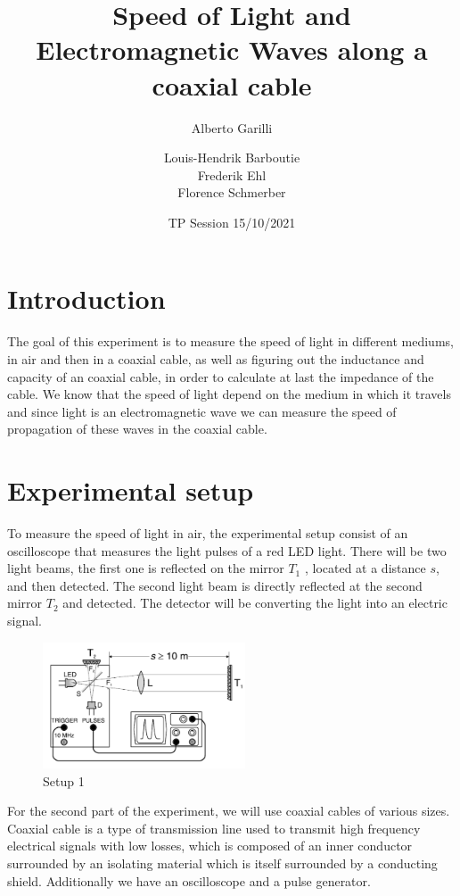 \documentclass{scrartcl}
\title{Speed of Light and Electromagnetic Waves along a coaxial cable}
\subtitle{Alberto Garilli}
\date{TP Session 15/10/2021}
\author{Louis-Hendrik Barboutie \\ Frederik Ehl \\ Florence Schmerber}
\begin{document}
\maketitle

\clearpage

\tableofcontents
\listoffigures
	
\clearpage

\section{Introduction}

The goal of this experiment is to measure the speed of light in different mediums, in air and then in a coaxial cable, as well as figuring out the inductance and capacity of an coaxial cable, in order to calculate at last the impedance of the cable. We know that the speed of light depend on the medium in which it travels and since light is an electromagnetic wave we can measure the speed of propagation of these waves in the coaxial cable.
\section{Experimental setup}

To measure the speed of light in air, the experimental setup consist of an oscilloscope that measures the light pulses of a red LED light. There will be two light beams, the first one is reflected on the mirror $T_1$ , located at a distance $s$, and then detected. The second light beam is directly reflected at the second mirror $T_2$ and detected. The detector will be converting the light into an electric signal.

\begin{figure}[h]
    \centering
    \includegraphics[width=6cm]{exp_1.png}
    \caption{Setup 1}
    \label{fig:setup1}
\end{figure}

For the second part of the experiment, we will use coaxial cables of various sizes. Coaxial cable is a type of transmission line used to transmit high frequency electrical signals with low losses, which is composed of an inner conductor surrounded by an isolating material which is itself surrounded by a conducting shield. Additionally we have an oscilloscope and a pulse generator.
\end{document}
